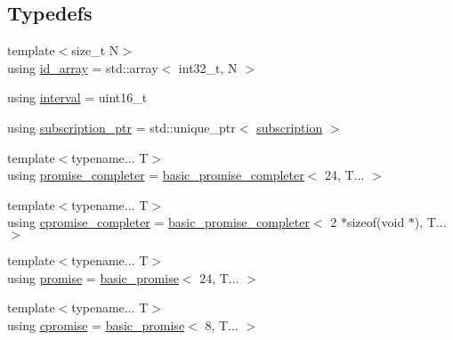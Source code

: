 \subsection*{Typedefs}
\begin{DoxyCompactItemize}
\item 
{\footnotesize template$<$size\+\_\+t N$>$ }\\using \hyperlink{namespacetelegen_acc765ed2873f0f8fb3fbbe40b04bbf40}{id\+\_\+array} = std\+::array$<$ int32\+\_\+t, N $>$
\item 
using \hyperlink{namespacetelegen_ad925de2d0a99bc43918533abf0457344}{interval} = uint16\+\_\+t
\item 
using \hyperlink{namespacetelegen_a27c822534a5231fe1c523c81e8768afb}{subscription\+\_\+ptr} = std\+::unique\+\_\+ptr$<$ \hyperlink{classtelegen_1_1subscription}{subscription} $>$
\item 
{\footnotesize template$<$typename... T$>$ }\\using \hyperlink{namespacetelegen_add9ca0e0a0f74c60e76b94f56c17edc7}{promise\+\_\+completer} = \hyperlink{classtelegen_1_1basic__promise__completer}{basic\+\_\+promise\+\_\+completer}$<$ 24, T... $>$
\item 
{\footnotesize template$<$typename... T$>$ }\\using \hyperlink{namespacetelegen_a2317bde5362d45695c42b49fcf2ee54f}{cpromise\+\_\+completer} = \hyperlink{classtelegen_1_1basic__promise__completer}{basic\+\_\+promise\+\_\+completer}$<$ 2 $\ast$sizeof(void $\ast$), T... $>$
\item 
{\footnotesize template$<$typename... T$>$ }\\using \hyperlink{namespacetelegen_a9dd802bb5d30cf96b0c616750d43ae86}{promise} = \hyperlink{classtelegen_1_1basic__promise}{basic\+\_\+promise}$<$ 24, T... $>$
\item 
{\footnotesize template$<$typename... T$>$ }\\using \hyperlink{namespacetelegen_a73ca2c44e7e302c2405f99a28e35acb7}{cpromise} = \hyperlink{classtelegen_1_1basic__promise}{basic\+\_\+promise}$<$ 8, T... $>$
\end{DoxyCompactItemize}
